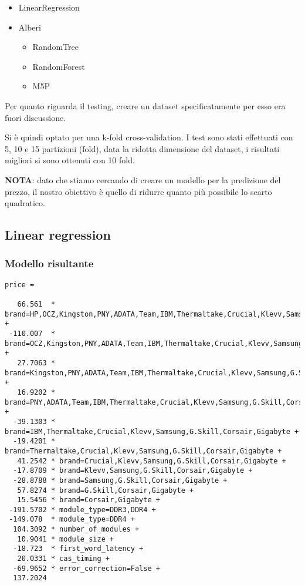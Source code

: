 \documentclass[12pt]{report}
\begin{document}
\begin{itemize}
	\item LinearRegression
	\item Alberi
		\begin {itemize}
	\item RandomTree
	\item RandomForest
	\item M5P
\end{itemize}
\end{itemize}

Per quanto riguarda il testing, creare un dataset specificatamente per esso era fuori discussione.

Si è quindi optato per una k-fold cross-validation. I test sono stati effettuati con 5, 10 e 15
partizioni (fold), data la ridotta dimensione del dataset, i risultati migliori si sono ottenuti con 10 fold.

\textbf{NOTA}: dato che stiamo cercando di creare un modello per la predizione del prezzo, il nostro obiettivo
è quello di ridurre quanto più possibile lo scarto quadratico.

\newpage
\subsection{Linear regression}

\subsubsection{Modello risultante}
\begin{lstlisting}
price =

   66.561  * brand=HP,OCZ,Kingston,PNY,ADATA,Team,IBM,Thermaltake,Crucial,Klevv,Samsung,G.Skill,Corsair,Gigabyte +
 -110.007  * brand=OCZ,Kingston,PNY,ADATA,Team,IBM,Thermaltake,Crucial,Klevv,Samsung,G.Skill,Corsair,Gigabyte +
   27.7063 * brand=Kingston,PNY,ADATA,Team,IBM,Thermaltake,Crucial,Klevv,Samsung,G.Skill,Corsair,Gigabyte +
   16.9202 * brand=PNY,ADATA,Team,IBM,Thermaltake,Crucial,Klevv,Samsung,G.Skill,Corsair,Gigabyte +
  -39.1303 * brand=IBM,Thermaltake,Crucial,Klevv,Samsung,G.Skill,Corsair,Gigabyte +
  -19.4201 * brand=Thermaltake,Crucial,Klevv,Samsung,G.Skill,Corsair,Gigabyte +
   41.2542 * brand=Crucial,Klevv,Samsung,G.Skill,Corsair,Gigabyte +
  -17.8709 * brand=Klevv,Samsung,G.Skill,Corsair,Gigabyte +
  -28.8788 * brand=Samsung,G.Skill,Corsair,Gigabyte +
   57.8274 * brand=G.Skill,Corsair,Gigabyte +
   15.5456 * brand=Corsair,Gigabyte +
 -191.5702 * module_type=DDR3,DDR4 +
 -149.078  * module_type=DDR4 +
  104.3092 * number_of_modules +
   10.9041 * module_size +
  -18.723  * first_word_latency +
   20.0331 * cas_timing +
  -69.9652 * error_correction=False +
  137.2024
\end{lstlisting}
\end{document}
